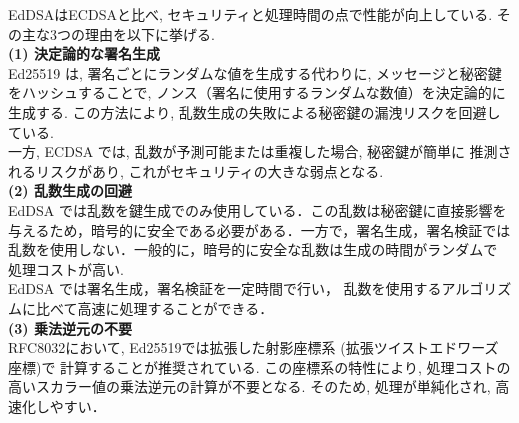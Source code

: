 EdDSAはECDSAと比べ, セキュリティと処理時間の点で性能が向上している. 
その主な3つの理由を以下に挙げる. \\[0.5em]
\noindent\textbf{(1) 決定論的な署名生成}\\
\indent Ed25519 は, 署名ごとにランダムな値を生成する代わりに, 
メッセージと秘密鍵をハッシュすることで, 
ノンス（署名に使用するランダムな数値）を決定論的に生成する.
この方法により, 乱数生成の失敗による秘密鍵の漏洩リスクを回避している. \\
\indent 一方, ECDSA では, 乱数が予測可能または重複した場合, 秘密鍵が簡単に
推測されるリスクがあり, これがセキュリティの大きな弱点となる.\\[0.5em]
\noindent\textbf{(2) 乱数生成の回避} \leavevmode\\
\indent EdDSA では乱数を鍵生成でのみ使用している．この乱数は秘密鍵に直接影響を
与えるため，暗号的に安全である必要がある．一方で，署名生成，署名検証では
乱数を使用しない．一般的に，暗号的に安全な乱数は生成の時間がランダムで
処理コストが高い. \\
\indent EdDSA では署名生成，署名検証を一定時間で行い，
乱数を使用するアルゴリズムに比べて高速に処理することができる．\\[0.5em]
\noindent\textbf{(3) 乗法逆元の不要} \leavevmode\\
\indent RFC8032において, Ed25519では拡張した射影座標系 (拡張ツイストエドワーズ座標)で
計算することが推奨されている.
この座標系の特性により, 処理コストの高いスカラー値の乗法逆元の計算が不要となる. 
そのため, 処理が単純化され, 高速化しやすい．

